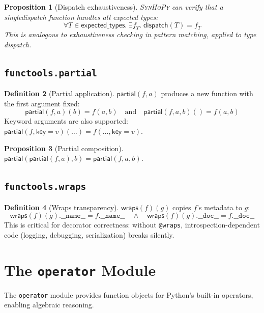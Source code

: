 \documentclass[11pt,a4paper]{report}
\theoremstyle{definition}
\newtheorem{definition}{Definition}[chapter]
\theoremstyle{plain}
\newtheorem{proposition}[definition]{Proposition}
\newcommand{\synhopy}{\textsc{SynHoPy}}
\begin{document}
\begin{proposition}[Dispatch exhaustiveness]
\synhopy{} can verify that a singledispatch function handles all expected types:
\[
  \forall T \in \mathsf{expected\_types}.\; \exists f_T.\;
  \mathsf{dispatch}(T) = f_T
\]
This is analogous to exhaustiveness checking in pattern matching, applied to type dispatch.
\end{proposition}

\subsection{\texttt{functools.partial}}

\begin{definition}[Partial application]
$\mathsf{partial}(f, a)$ produces a new function with the first argument fixed:
\[
  \mathsf{partial}(f, a)(b) = f(a, b) \quad\text{and}\quad
  \mathsf{partial}(f, a, b)() = f(a, b)
\]
Keyword arguments are also supported:
$\mathsf{partial}(f, \mathsf{key}=v)(\ldots) = f(\ldots, \mathsf{key}=v)$.
\end{definition}

\begin{proposition}[Partial composition]
$\mathsf{partial}(\mathsf{partial}(f, a), b) = \mathsf{partial}(f, a, b)$.
\end{proposition}

\subsection{\texttt{functools.wraps}}

\begin{definition}[Wraps transparency]
$\mathsf{wraps}(f)(g)$ copies $f$'s metadata to $g$:
\[
  \mathsf{wraps}(f)(g).\mathtt{\_\_name\_\_} = f.\mathtt{\_\_name\_\_}
  \quad\land\quad
  \mathsf{wraps}(f)(g).\mathtt{\_\_doc\_\_} = f.\mathtt{\_\_doc\_\_}
\]
This is critical for decorator correctness: without \lstinline[style=python]{@wraps},
introspection-dependent code (logging, debugging, serialization) breaks silently.
\end{definition}


\section{The \texttt{operator} Module}

The \lstinline[style=python]{operator} module provides function objects for
Python's built-in operators, enabling algebraic reasoning.
\end{document}
